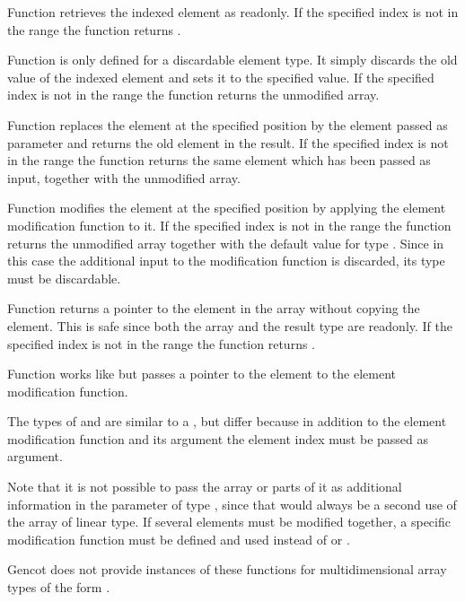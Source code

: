 Function  retrieves the indexed element as readonly. If the specified index 
is not in the range  the function returns .

Function  is only defined for a discardable element type. 
It simply discards the old value of the indexed element and sets it to the specified value.
If the specified index is not in the range  the function returns the unmodified array.

Function 
replaces the element at the specified position by the element passed as parameter and returns the old element in the result.
If the specified
index is not in the range  the function returns the same element which has been
passed as input, together with the unmodified array. 

Function  modifies the element at the specified position by applying the element modification function
to it. If the specified
index is not in the range  the function returns the unmodified array together with the default value
 for type . Since in this case the 
additional input to the modification function is discarded, its type  must be discardable.

Function  returns a pointer to the element in the array without copying the element. This is safe since 
both the array and the result
type are readonly. If the specified index is not in the range  the function returns . 

Function  works like  but passes a pointer to the element to the element modification function.

The types of  and  are similar to a , but differ because in addition to the 
element modification function and its argument the element index must be passed as argument.

Note that it is not possible
to pass the array or parts of it as additional information in the parameter of type , since that would always be
a second use of the array of linear type. If several elements must be modified together, a specific modification function
must be defined and used instead of  or .

Gencot does not provide instances of these functions for multidimensional array types of the form .


